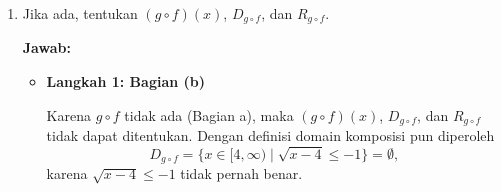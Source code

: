 \documentclass[10pt,a4paper]{article}
\begin{document}
\begin{enumerate}
\begin{enumerate}
\item Jika ada, tentukan $(g \circ f)(x)$, $D_{g \circ f}$, dan $R_{g \circ f}$.

\textbf{Jawab:}
\begin{itemize}
\item \textbf{Langkah 1: Bagian (b)}

Karena $g \circ f$ tidak ada (Bagian a), maka $(g \circ f)(x)$, $D_{g \circ f}$, dan $R_{g \circ f}$ tidak dapat ditentukan.
Dengan definisi domain komposisi pun diperoleh
\[
D_{g \circ f} = \{x \in [4, \infty) \mid \sqrt{x - 4} \leq -1\} = \emptyset,
\]
karena $\sqrt{x - 4} \leq -1$ tidak pernah benar.
\end{itemize}
\end{enumerate}

\end{enumerate}
\end{document}
